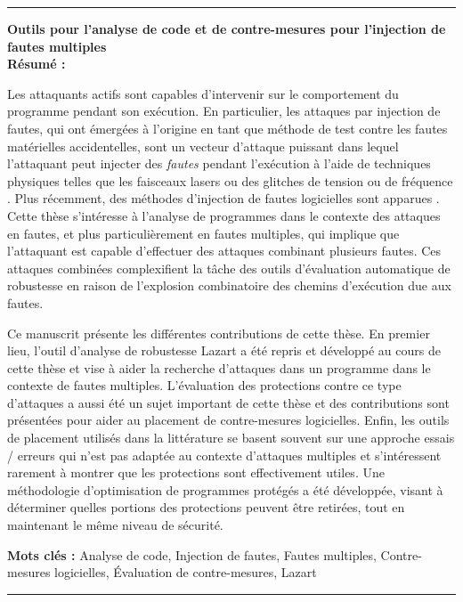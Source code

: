 \documentclass[a4paper,10pt,twoside]{lib/StyleThese}
\begin{document}
\cleardoublepage
\begin{vcenterpage}
    \noindent\rule[2pt]{\textwidth}{0.5pt}
    {\large\textbf{Outils pour l’analyse de code et de contre-mesures pour l'injection de fautes multiples\\}}
    {\large\textbf{Résumé :}}
    
        Les attaquants actifs sont capables d'intervenir sur le comportement du programme pendant son exécution. En particulier, les attaques par injection de fautes, qui ont émergées à l'origine en tant que méthode de test contre les fautes matérielles accidentelles, sont un vecteur d'attaque puissant dans lequel l'attaquant peut injecter des \textit{fautes} pendant l'exécution à l'aide de techniques physiques telles que les faisceaux lasers \cite{Roscian/FDTC13, Colombier/HOST19} ou des glitches de tension \cite{BarEl/IEEE06} ou de fréquence \cite{Agoyan/SCRAA10, Yuce/HSS18}. Plus récemment, des méthodes d'injection de fautes logicielles sont apparues \cite{Park/IIRW14}.
        Cette thèse s'intéresse à l'analyse de programmes dans le contexte des attaques en fautes, et plus particulièrement en fautes multiples, qui implique que l'attaquant est capable d'effectuer des attaques combinant plusieurs fautes. 
        Ces attaques combinées complexifient la tâche des outils d'évaluation automatique de robustesse en raison de l'explosion combinatoire des chemins d'exécution due aux fautes.
        
        Ce manuscrit présente les différentes contributions de cette thèse.
        En premier lieu, l'outil d'analyse de robustesse Lazart a été repris et développé au cours de cette thèse et vise à aider la recherche d'attaques dans un programme dans le contexte de fautes multiples.
        L'évaluation des protections contre ce type d'attaques a aussi été un sujet important de cette thèse et des contributions sont présentées pour aider au placement de contre-mesures logicielles.
        Enfin, les outils de placement utilisés dans la littérature se basent souvent sur une approche essais / erreurs qui n'est pas adaptée au contexte d'attaques multiples et s'intéressent rarement à montrer que les protections sont effectivement utiles. Une méthodologie d'optimisation de programmes protégés a été développée, visant à déterminer quelles portions des protections peuvent être retirées, tout en maintenant le même niveau de sécurité.
    
    {\large\textbf{Mots clés :}}
    Analyse de code, Injection de fautes, Fautes multiples, Contre-mesures logicielles, Évaluation de contre-mesures, Lazart
    \\
    \noindent\rule[2pt]{\textwidth}{0.5pt}
\end{vcenterpage}
\end{document}
